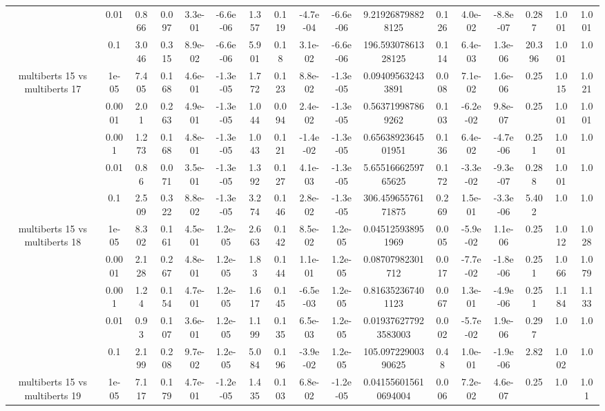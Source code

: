 \begin{tabular}{|c|c|c|c|c|c|c|c|c|c|c|c|c|c|c|c|c|}
 & 0.01 & 0.866 & 0.097 & 3.3e-01 & -6.6e-06 & 1.357 & 0.119 & -4.7e-04 & -6.6e-06 & 9.219268798828125 & 0.126 & 4.0e-02 & -8.8e-07 & 0.287 & 1.001 & 1.001 \\
 & 0.1 & 3.046 & 0.315 & 8.9e-02 & -6.6e-06 & 5.901 & 0.18 & 3.1e-02 & -6.6e-06 & 196.59307861328125 & 0.114 & 6.4e-03 & 1.3e-06 & 20.396 & 1.001 & 1.0 \\
\hline
\multirow{5}{*}{multiberts 15 vs multiberts 17} & 1e-05 & 7.405 & 0.168 & 4.6e-01 & -1.3e-05 & 1.772 & 0.123 & 8.8e-02 & -1.3e-05 & 0.094095632433891 & 0.008 & 7.1e-02 & 1.6e-06 & 0.25 & 1.015 & 1.021 \\
 & 0.0001 & 2.01 & 0.263 & 4.9e-01 & -1.3e-05 & 1.044 & 0.094 & 2.4e-02 & -1.3e-05 & 0.563719987869262 & 0.103 & -6.2e-02 & 9.8e-07 & 0.25 & 1.001 & 1.001 \\
 & 0.001 & 1.273 & 0.168 & 4.8e-01 & -1.3e-05 & 1.043 & 0.121 & -1.4e-02 & -1.3e-05 & 0.6563892364501951 & 0.136 & 6.4e-02 & -4.7e-06 & 0.251 & 1.001 & 1.0 \\
 & 0.01 & 0.86 & 0.071 & 3.5e-01 & -1.3e-05 & 1.392 & 0.127 & 4.1e-03 & -1.3e-05 & 5.6551666259765625 & 0.172 & -3.3e-02 & -9.3e-07 & 0.288 & 1.001 & 1.0 \\
 & 0.1 & 2.509 & 0.322 & 8.8e-02 & -1.3e-05 & 3.274 & 0.146 & 2.8e-02 & -1.3e-05 & 306.45965576171875 & 0.269 & 1.5e-01 & -3.3e-06 & 5.402 & 1.0 & 1.0 \\
\hline
\multirow{5}{*}{multiberts 15 vs multiberts 18} & 1e-05 & 8.302 & 0.161 & 4.5e-01 & 1.2e-05 & 2.663 & 0.142 & 8.5e-02 & 1.2e-05 & 0.045125938951969 & 0.005 & -5.9e-02 & 1.1e-06 & 0.25 & 1.012 & 1.028 \\
 & 0.0001 & 2.128 & 0.267 & 4.8e-01 & 1.2e-05 & 1.83 & 0.144 & 1.1e-01 & 1.2e-05 & 0.08707982301712 & 0.017 & -7.7e-02 & -1.8e-06 & 0.251 & 1.066 & 1.079 \\
 & 0.001 & 1.24 & 0.154 & 4.7e-01 & 1.2e-05 & 1.617 & 0.145 & -6.5e-03 & 1.2e-05 & 0.816352367401123 & 0.067 & 1.3e-01 & -4.9e-06 & 0.251 & 1.184 & 1.133 \\
 & 0.01 & 0.93 & 0.107 & 3.6e-01 & 1.2e-05 & 1.199 & 0.135 & 6.5e-03 & 1.2e-05 & 0.019376277923583003 & 0.002 & -5.7e-02 & 1.9e-06 & 0.297 & 1.0 & 1.0 \\
 & 0.1 & 2.199 & 0.208 & 9.7e-02 & 1.2e-05 & 5.084 & 0.196 & -3.9e-02 & 1.2e-05 & 105.09722900390625 & 0.48 & 1.0e-01 & -1.9e-06 & 2.82 & 1.002 & 1.0 \\
\hline
\multirow{5}{*}{multiberts 15 vs multiberts 19} & 1e-05 & 7.117 & 0.179 & 4.7e-01 & -1.2e-05 & 1.435 & 0.103 & 6.8e-02 & -1.2e-05 & 0.041556015610694004 & 0.006 & 7.2e-02 & 4.6e-07 & 0.25 & 1.0 & 1.01 \\

\end{tabular}
